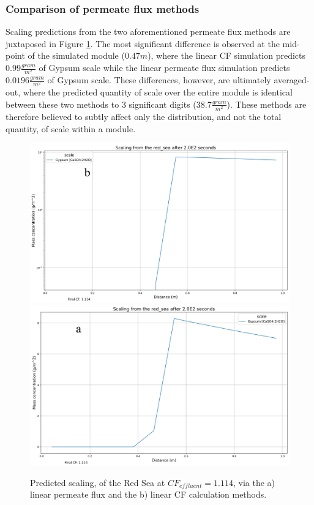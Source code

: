 \subsubsection{Comparison of permeate flux methods}
Scaling predictions from the two aforementioned permeate flux methods are juxtaposed in Figure \ref{permeate_approach}. The most significant difference is observed at the mid-point of the simulated module ($0.47 m$), where the linear CF simulation predicts $0.99 \frac{gram}{m^2}$ of Gypsum scale while the linear permeate flux simulation predicts $0.0196 \frac{gram}{m^2}$ of Gypsum scale. These differences, however, are ultimately averaged-out, where the predicted quantity of scale over the entire module is identical between these two methods to 3 significant digits ($38.7 \frac{gram}{m^2}$). These methods are therefore believed to subtly affect only the distribution, and not the total quantity, of scale within a module. 

\begin{figure}[t]
    \centering
    \includegraphics[width=\linewidth]{images/ROSSpy/sensitivity_analyses/permeate_approach/linear_permeate.png} \\ \midrule
    \includegraphics[width=\linewidth]{images/ROSSpy/sensitivity_analyses/permeate_approach/linear_cf.png} 
    \caption{
        Predicted scaling, of the Red Sea at $CF_{effluent}=1.114$, via the a) linear permeate flux and the b) linear CF calculation methods. 
    }
    \label{permeate_approach}
\end{figure}


